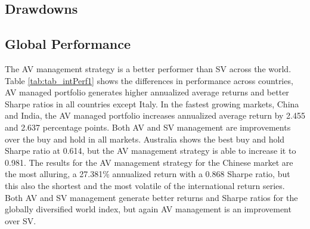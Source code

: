 %

\subsection{Drawdowns}

 \label{sec:drawdowns}

\subsection{Global Performance}

The AV management strategy is a better performer than SV across the world. Table \ref{tab:tab_intPerf1} shows the differences in performance across countries, AV managed portfolio generates higher annualized average returns and better Sharpe ratios in all countries except Italy. In the fastest growing markets, China and India, the AV managed portfolio increases annualized average return by 2.455 and 2.637 percentage points. Both AV and SV management are improvements over the buy and hold in all markets. Australia shows the best buy and hold Sharpe ratio at 0.614, but the AV management strategy is able to increase it to 0.981. The results for the AV management strategy for the Chinese market are the most alluring, a 27.381\% annualized return with a 0.868 Sharpe ratio, but this also the shortest and the most volatile of the international return series. Both AV and SV management generate better returns and Sharpe ratios for the globally diversified world index, but again AV management is an improvement over SV.

